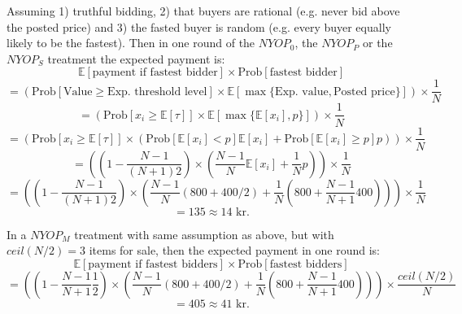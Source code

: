 \documentclass[a4paper,12pt]{article}
\begin{document}
	Assuming 1) truthful bidding, 2) that buyers are rational (e.g. never bid above the posted price) and 3) the fasted buyer is random (e.g. every buyer equally likely to be the fastest). Then in one round of the $NYOP_0$, the $NYOP_P$ or the $NYOP_S$ treatment the expected payment is:
	\[ \mathbb{E}[\mbox{payment if fastest bidder}] \times \mbox{Prob}[\mbox{fastest bidder}] \] 
	\[  = \left( \mbox{Prob}[\mbox{Value} \ge \mbox{Exp. threshold level}] \times \mathbb{E}[\max\{\mbox{Exp. value}, \mbox{Posted price}\}] \right) \times \frac{1}{N} \] 
	\[  = \left( \mbox{Prob}[x_i \ge \mathbb{E}[\tau]] \times \mathbb{E}[\max\{\mathbb{E}[x_i], p\}]  \right) \times \frac{1}{N} \] 
	\[  = \left( \mbox{Prob}[x_i \ge \mathbb{E}[\tau]] \times ( \mbox{Prob}[\mathbb{E}[x_i] < p] \mathbb{E}[x_i] + \mbox{Prob}[\mathbb{E}[x_i] \ge p] p ) \right) \times \frac{1}{N} \] 
	\[  = \left( \left(1-\frac{N-1}{(N+1)2}\right) \times \left( \frac{N-1}{N} \mathbb{E}[x_i] + \frac{1}{N} p \right) \right) \times \frac{1}{N} \] 
	\[  = \left( \left(1-\frac{N-1}{(N+1)2}\right) \times \left( \frac{N-1}{N} (800+400/2) + \frac{1}{N} \left(800+\frac{N-1}{N+1}400\right) \right) \right) \times \frac{1}{N} \] 
	\[	= 135 \approx 14\mbox{ kr.} \]
	
	In a $NYOP_M$ treatment with same assumption as above, but with $ceil(N/2)=3$ items for sale, then the expected payment in one round is:
	\[ \mathbb{E}[\mbox{payment if fastest bidders}] \times \mbox{Prob}[\mbox{fastest bidders}] \] 
	\[  = \left( \left(1-\frac{N-1}{N+1}\frac{1}{2}\right) \times \left( \frac{N-1}{N} (800+400/2) + \frac{1}{N} \left(800+\frac{N-1}{N+1}400\right) \right) \right) \times \frac{ceil(N/2)}{N} \] 
	\[	= 405 \approx 41\mbox{ kr.} \]
\end{document}
